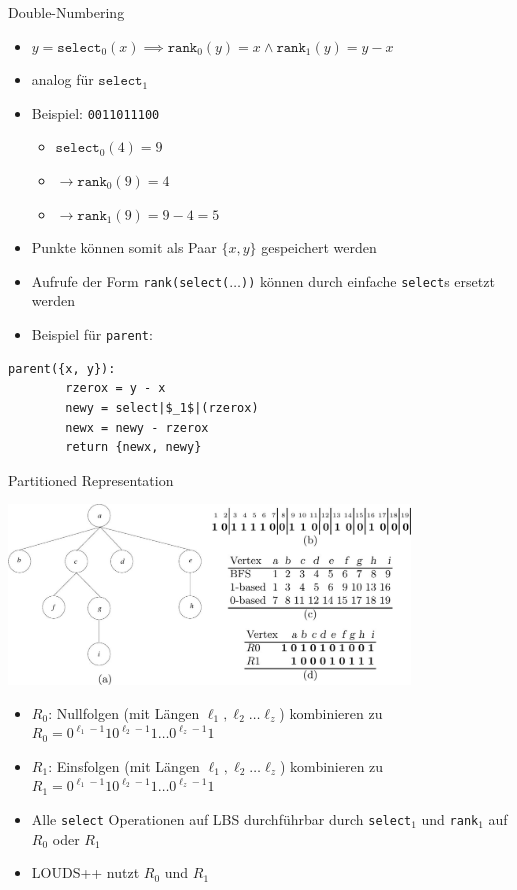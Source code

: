 \documentclass[ngerman,aspectratio=169,10pt]{beamer}
\begin{document}
\begin{frame}[fragile]{Double-Numbering}
    \begin{itemize}
        \item $y=\texttt{select}_0(x)\implies \texttt{rank}_0(y)=x\wedge \texttt{rank}_1(y)=y-x$
        \item analog für $\texttt{select}_1$
        \pause
        \item Beispiel: \texttt{0011011100}
            \begin{itemize}
                \item $\texttt{select}_0(4)=9$
                \item $\rightarrow \texttt{rank}_0(9)=4$
                \item $\rightarrow \texttt{rank}_1(9)=9-4=5$
            \end{itemize}
        \pause
        \item Punkte können somit als Paar $\{x, y\}$ gespeichert werden
        \item Aufrufe der Form \texttt{rank(select($\dots$))} können durch einfache \texttt{select}s ersetzt werden
        \item Beispiel für \texttt{parent}:
    \end{itemize}
	\begin{lstlisting}[escapechar=|]
	parent({x, y}):
		rzerox = y - x
		newy = select|$_1$|(rzerox)
		newx = newy - rzerox
		return {newx, newy}
	\end{lstlisting}
\end{frame}

\begin{frame}{Partitioned Representation}
    \begin{center}
        \includegraphics[width=0.8\textwidth]{LOUDS.jpg}
    \end{center}
    \begin{itemize}
        \item $R_0$: Nullfolgen (mit Längen $\ell_1,\ell_2\ldots\ell_z$) kombinieren zu $R_0=0^{\ell_1-1}10^{\ell_2-1}1\ldots0^{\ell_z-1}1$
        \item  $R_1$: Einsfolgen (mit Längen $\ell_1,\ell_2\ldots\ell_z$) kombinieren zu $R_1=0^{\ell_1-1}10^{\ell_2-1}1\ldots0^{\ell_z-1}1$
        \item Alle \texttt{select} Operationen auf LBS durchführbar durch \texttt{select}$_1$ und \texttt{rank}$_1$ auf $R_0$ oder $R_1$
        \item LOUDS++ nutzt $R_0$ und $R_1$
    \end{itemize}
\end{frame}
\end{document}
